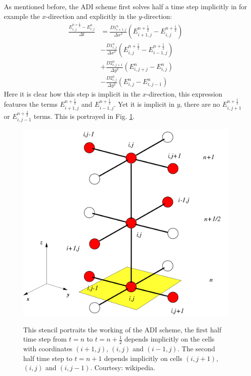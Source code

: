 As mentioned before, the ADI scheme first solves half a time step implicitly in for example the $x$-direction and explicitly in the $y$-direction:
\begin{align}
\frac{E_{i,j}^{n+\frac{1}{2}} - E_{i,j}^{n}}{\Delta t}
 &= \frac{D1_{i+1,j}^{n}}{\Delta x^2} (E_{i+1,j}^{n+\frac{1}{2}} - E_{i,j}^{n+\frac{1}{2}}) \\
 &- \frac{D1_{i,j}^{n}}{\Delta x^2} (E_{i,j}^{n+\frac{1}{2}} - E_{i-1,j}^{n+\frac{1}{2}}) \\
 &+ \frac{D2_{i,j+1}^{n}}{\Delta y^2} (E_{i,j+j}^{n} - E_{i,j}^{n}) \\
 &- \frac{D2_{i,j}^{n}}{\Delta y^2} (E_{i,j}^{n} - E_{i,j-1}^{n})
\end{align}
Here it is clear how this step is implicit in the $x$-direction, this expression features the terms $E_{i+1,j}^{n+\frac{1}{2}}$ and $E_{i-1,j}^{n+\frac{1}{2}}$. Yet it is implicit in $y$, there are no $E_{i,j+1}^{n+\frac{1}{2}}$ or $E_{i,j-1}^{n+\frac{1}{2}}$ terms. This is portrayed in Fig. \ref{fig: ADI_stencil}.\\
\begin{figure}
\centering	
\includegraphics[scale=0.5]{ADI-stencil.png}
\label{fig: ADI_stencil}
\caption{This stencil portraits the working of the ADI scheme, the first half time step from $t=n$ to $t = n +\frac{1}{2}$ depends implicitly on the cells with coordinates $(i+1,j)$, $(i,j)$ and $(i-1,j)$. The second half time step to $t = n+1$ depends implicitly on cells $(i,j+1)$, $(i,j)$ and $(i,j-1)$. Courtesy: wikipedia.}
\end{figure}

